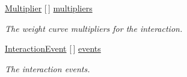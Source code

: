 \begin{DoxyCompactItemize}
\mbox{\hyperlink{class_root_motion_1_1_final_i_k_1_1_interaction_object_1_1_multiplier}{Multiplier}} \mbox{[}$\,$\mbox{]} \mbox{\hyperlink{class_root_motion_1_1_final_i_k_1_1_interaction_object_adbff188ad1baf1072b8db4e80a8d7ec4}{multipliers}}
\begin{DoxyCompactList}\small\item\em The weight curve multipliers for the interaction. \end{DoxyCompactList}\item 
\mbox{\hyperlink{class_root_motion_1_1_final_i_k_1_1_interaction_object_1_1_interaction_event}{Interaction\+Event}} \mbox{[}$\,$\mbox{]} \mbox{\hyperlink{class_root_motion_1_1_final_i_k_1_1_interaction_object_a604315fc84c3269ff2c0a804dec65df4}{events}}
\begin{DoxyCompactList}\small\item\em The interaction events. \end{DoxyCompactList}\end{DoxyCompactItemize}
